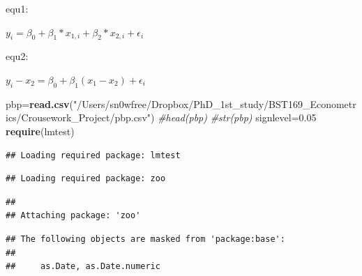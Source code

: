 \documentclass[]{article}
\newenvironment{Shaded}{\begin{snugshade}}{\end{snugshade}}
\newcommand{\KeywordTok}[1]{\textcolor[rgb]{0.13,0.29,0.53}{\textbf{{#1}}}}
\newcommand{\DataTypeTok}[1]{\textcolor[rgb]{0.13,0.29,0.53}{{#1}}}
\newcommand{\DecValTok}[1]{\textcolor[rgb]{0.00,0.00,0.81}{{#1}}}
\newcommand{\FloatTok}[1]{\textcolor[rgb]{0.00,0.00,0.81}{{#1}}}
\newcommand{\StringTok}[1]{\textcolor[rgb]{0.31,0.60,0.02}{{#1}}}
\newcommand{\CommentTok}[1]{\textcolor[rgb]{0.56,0.35,0.01}{\textit{{#1}}}}
\newcommand{\NormalTok}[1]{{#1}}
\begin{document}
equ1:\centerline{$y_i = \beta_0 +\beta_1*x_{1,i} +\beta_2*x_{2,i} +\epsilon_i$}
equ2:\centerline{$y_{i}-x_{2}=\beta_{0}+\beta_{1}(x_{1}-x_{2})+\epsilon_{i}$}

\begin{Shaded}
\begin{Highlighting}[]
\NormalTok{pbp=}\KeywordTok{read.csv}\NormalTok{(}\StringTok{"/Users/sn0wfree/Dropbox/PhD_1st_study/BST169_Econometrics/Crousework_Project/pbp.csv"}\NormalTok{)}
\CommentTok{#head(pbp)}
\CommentTok{#str(pbp)}
\NormalTok{signlevel=}\FloatTok{0.05}
\KeywordTok{require}\NormalTok{(lmtest)}
\end{Highlighting}
\end{Shaded}

\begin{verbatim}
## Loading required package: lmtest
\end{verbatim}

\begin{verbatim}
## Loading required package: zoo
\end{verbatim}

\begin{verbatim}
## 
## Attaching package: 'zoo'
\end{verbatim}

\begin{verbatim}
## The following objects are masked from 'package:base':
## 
##     as.Date, as.Date.numeric
\end{verbatim}

\begin{Shaded}
\end{Shaded}
\end{document}
